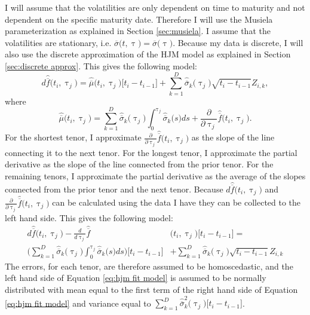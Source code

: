 \noindent I will assume that the volatilities are only dependent on time to maturity and not dependent on the specific maturity date. Therefore I will use the Musiela parameterization as explained in Section \ref{sec:musiela}. I assume that the volatilities are stationary, i.e. $\overline{\sigma} \bigl( t, \uptau \bigr) = \overline{\sigma} \bigl( \uptau \bigr)$. Because my data is discrete, I will also use the discrete approximation of the HJM model as explained in Section \ref{sec:discrete approx}. This gives the following model: \begin{equation*}
    d \hat{\overline{f}} \bigl( t_i , \uptau_j \bigr) = \hat{\overline{\mu}} \bigl( t_i , \uptau_j \bigr) \bigl[ t_i - t_{i - 1} \bigr] + \sum_{k=1}^D \hat{\overline{\sigma}}_k \bigl( \uptau_j \bigr) \sqrt{t_i - t_{i - 1}} Z_{i,k},
\end{equation*} where \begin{equation*}
    \hat{\overline{\mu}} \bigl( t_i , \uptau_j \bigr) = \sum_{k=1}^D \hat{\overline{\sigma}}_k \bigl( \uptau_j \bigr) \int_{0}^{\uptau_j} \hat{\overline{\sigma}}_k \bigl( s \bigr)ds + \frac{\partial}{\partial \uptau_j} \hat{\overline{f}} \bigl( t_i , \uptau_j \bigr).
\end{equation*} For the shortest tenor, I approximate $\frac{\partial}{\partial \uptau_j} \hat{\overline{f}} \bigl( t_i , \uptau_j \bigr)$ as the slope of the line connecting it to the next tenor. For the longest tenor, I approximate the partial derivative as the slope of the line connected from the prior tenor. For the remaining tenors, I approximate the partial derivative as the average of the slopes connected from the prior tenor and the next tenor. Because $d \hat{\overline{f}} \bigl( t_i , \uptau_j \bigr)$ and $\frac{\partial}{\partial \uptau_j} \hat{\overline{f}} \bigl( t_i , \uptau_j \bigr)$ can be calculated using the data I have they can be collected to the left hand side. This gives the following model: \begin{equation} \label{eq:hjm fit model}
    \begin{split}
        d \hat{\overline{f}} \bigl( t_i , \uptau_j \bigr) - \frac{d}{d \uptau_j} \hat{\overline{f}} &\bigl( t_i , \uptau_j \bigr) \bigl[ t_i - t_{i - 1} \bigr] = \\ \Biggl( \sum_{k=1}^D \hat{\overline{\sigma}}_k \bigl( \uptau_j \bigr) \int_{0}^{\uptau_j} \hat{\overline{\sigma}}_k \bigl( s \bigr)ds \Biggr) \bigl[ t_i - t_{i - 1} \bigr] &+ \sum_{k=1}^D \hat{\overline{\sigma}}_k \bigl( \uptau_j \bigr) \sqrt{t_i - t_{i - 1}} Z_{i,k}
    \end{split}
\end{equation} \newpage \noindent The errors, for each tenor, are therefore assumed to be homoscedastic, and the left hand side of Equation \eqref{eq:hjm fit model} is assumed to be normally distributed with mean equal to the first term of the right hand side of Equation \eqref{eq:hjm fit model} and variance equal to $\sum_{k=1}^D \hat{\overline{\sigma}}_k^2 \bigl( \uptau_j \bigr) \bigl[ t_i - t_{i - 1} \bigr]$.


